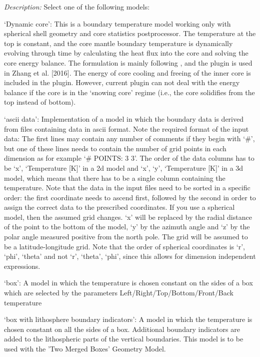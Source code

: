 \begin{itemize}
{\it Description:} Select one of the following models:

`Dynamic core': This is a boundary temperature model working only with spherical shell geometry and core statistics postprocessor. The temperature at the top is constant, and the core mantle boundary temperature is dynamically evolving through time by calculating the heat flux into the core and solving the core energy balance. The formulation is mainly following \cite{NPB+04}, and the plugin is used in Zhang et al. [2016]. The energy of core cooling and freeing of the inner core is included in the plugin. However, current plugin can not deal with the energy balance if the core is in the `snowing core' regime (i.e., the core solidifies from the top instead of bottom).

`ascii data': Implementation of a model in which the boundary data is derived from files containing data in ascii format. Note the required format of the input data: The first lines may contain any number of comments if they begin with `#', but one of these lines needs to contain the number of grid points in each dimension as for example `# POINTS: 3 3'. The order of the data columns has to be `x', `Temperature [K]' in a 2d model and  `x', `y', `Temperature [K]' in a 3d model, which means that there has to be a single column containing the temperature. Note that the data in the input files need to be sorted in a specific order: the first coordinate needs to ascend first, followed by the second in order to assign the correct data to the prescribed coordinates. If you use a spherical model, then the assumed grid changes. `x' will be replaced by the radial distance of the point to the bottom of the model, `y' by the azimuth angle and `z' by the polar angle measured positive from the north pole. The grid will be assumed to be a latitude-longitude grid. Note that the order of spherical coordinates is `r', `phi', `theta' and not `r', `theta', `phi', since this allows for dimension independent expressions.

`box': A model in which the temperature is chosen constant on the sides of a box which are selected by the parameters Left/Right/Top/Bottom/Front/Back temperature

`box with lithosphere boundary indicators': A model in which the temperature is chosen constant on all the sides of a box. Additional boundary indicators are added to the lithospheric parts of the vertical boundaries. This model is to be used with the 'Two Merged Boxes' Geometry Model.


\end{itemize}
